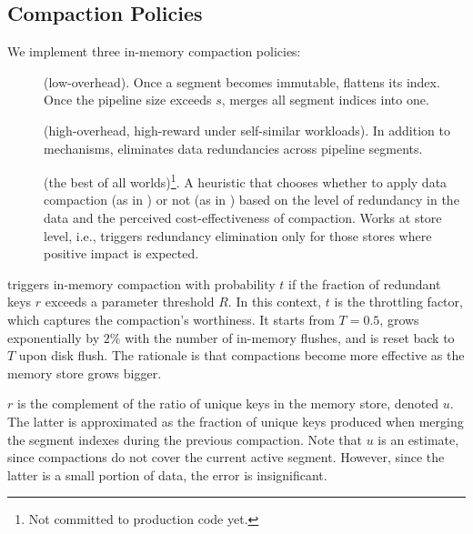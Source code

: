 \subsection{Compaction Policies} \label{ssec:policies}

We implement three in-memory compaction policies: 
\begin{description}
\item[\basic] (low-overhead). Once a segment becomes immutable, flattens its index. Once the pipeline size exceeds $s$, 
merges all segment indices into one.  
\item[\eager] (high-overhead, high-reward under self-similar workloads). 
In addition to \basic\/ mechanisms, eliminates data redundancies across pipeline segments.
\item[\adp] (the best of all worlds)\footnote{\small{Not committed to production code yet.}}. A heuristic that chooses 
whether to apply data compaction (as in \eager) or not (as in \basic) based on the level of redundancy in the data 
and the perceived cost-effectiveness of compaction. Works at store level, i.e., triggers redundancy elimination 
only for those stores where positive impact is expected. 
\end{description}

\adp\/ triggers in-memory compaction with probability $t$ if the fraction of redundant keys $r$ exceeds a parameter 
threshold $R$. In this context, $t$ is the throttling factor, which captures the compaction's worthiness. It starts from 
$T=0.5$, grows exponentially by $2\%$ with the number of in-memory flushes, and is reset back to $T$ upon
disk flush. The rationale is that compactions become more effective as the memory store grows bigger. 

$r$ is the complement of the ratio of unique keys in the memory store, denoted  $u$. The latter is approximated 
as the fraction of unique keys produced when merging the segment indexes during the previous compaction. 
Note that $u$ is an estimate, since compactions do not cover the current active segment. However, since the latter 
is a small portion of data, the error is insignificant. 

